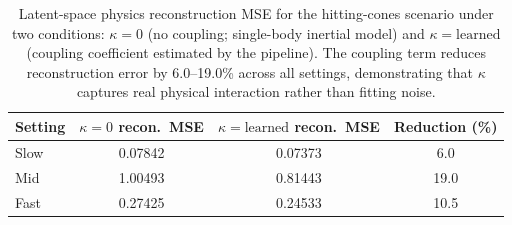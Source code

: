 \begin{table}[h]
\centering
\caption{Latent-space physics reconstruction MSE for the hitting-cones scenario under two conditions: $\kappa{=}0$ (no coupling; single-body inertial model) and $\kappa{=}\text{learned}$ (coupling coefficient estimated by the pipeline). The coupling term reduces reconstruction error by 6.0--19.0\% across all settings, demonstrating that $\kappa$ captures real physical interaction rather than fitting noise.}
\label{tab:kappa_ablation}
\begin{tabular}{lccc}
\toprule
Setting & $\kappa{=}0$ recon.\ MSE & $\kappa{=}\text{learned}$ recon.\ MSE & Reduction (\%) \\
\midrule
Slow & 0.07842 & 0.07373 & 6.0 \\
Mid & 1.00493 & 0.81443 & 19.0 \\
Fast & 0.27425 & 0.24533 & 10.5 \\
\bottomrule
\end{tabular}
\end{table}
